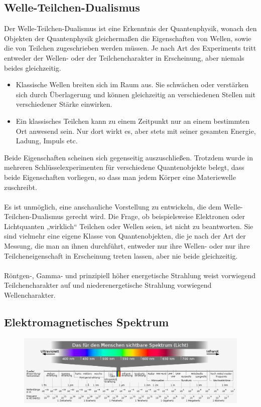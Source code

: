	\subsection{Welle-Teilchen-Dualismus}
		Der Welle-Teilchen-Dualismus ist eine Erkenntnis der Quantenphysik, wonach den Objekten der Quantenphysik gleichermaßen die Eigenschaften von Wellen, sowie die von  Teilchen zugeschrieben werden müssen. Je nach Art des Experiments tritt entweder der Wellen- oder der Teilchencharakter in Erscheinung, aber niemals beides gleichzeitig.
		\begin{itemize}
			\item Klassische Wellen breiten sich im Raum aus. Sie schwächen oder verstärken sich durch Überlagerung und können gleichzeitig an verschiedenen Stellen mit verschiedener Stärke einwirken.
			\item Ein klassisches Teilchen kann zu einem Zeitpunkt nur an einem bestimmten Ort anwesend sein. Nur dort wirkt es, aber stets mit seiner gesamten Energie, Ladung, Impuls etc.
		\end{itemize}
		Beide Eigenschaften scheinen sich gegenseitig auszuschließen. Trotzdem wurde in mehreren Schlüsselexperimenten für verschiedene Quantenobjekte belegt, dass beide Eigenschaften vorliegen, so dass man jedem Körper eine Materiewelle zuschreibt.\\\\
		Es ist unmöglich, eine anschauliche Vorstellung zu entwickeln, die dem Welle-Teilchen-Dualismus gerecht wird. Die Frage, ob beispielsweise Elektronen oder Lichtquanten „wirklich“ Teilchen oder Wellen seien, ist nicht zu beantworten. Sie sind vielmehr eine eigene Klasse von Quantenobjekten, die je nach der Art der Messung, die man an ihnen durchführt, entweder nur ihre Wellen- oder nur ihre Teilcheneigenschaft in Erscheinung treten lassen, aber nie beide gleichzeitig.\\\\
		Röntgen-, Gamma- und prinzipiell höher energetische Strahlung weist vorwiegend Teilchencharakter auf und niederenergetische Strahlung vorwiegend Wellencharakter.
		
	\subsection{Elektromagnetisches Spektrum}
		\begin{figure}[h]
			\centering
			\includegraphics[width=1\linewidth]{./pics/ph/spektrum.png}
		\end{figure}
	